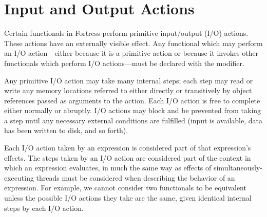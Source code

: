 %
%
%
%

\section{Input and Output Actions}


Certain functionals in Fortress perform primitive input/output (I/O)
actions.  These actions have an externally visible effect.
Any functional which may perform an I/O action---either
because it is a primitive action or because it invokes other
functionals which perform I/O actions---must be declared
with the  modifier.

Any primitive I/O action may take many internal steps; each step may
read or write any memory locations referred to either directly or
transitively by object references passed as arguments to the action.
Each I/O action is free to complete either normally or abruptly.
I/O actions may block and be prevented from taking a step until any
necessary external conditions are fulfilled (input is available, data
has been written to disk, and so forth).

Each I/O action taken by an expression is considered part of that
expression's effects.  The steps taken by an I/O action are considered
part of the context in which an expression evaluates, in much the same
way as effects of simultaneously-executing threads must be considered
when describing the behavior of an expression.  For example, we cannot
consider two functionals to be equivalent unless the possible I/O
actions they take are the same, given identical internal steps by each
I/O action.
